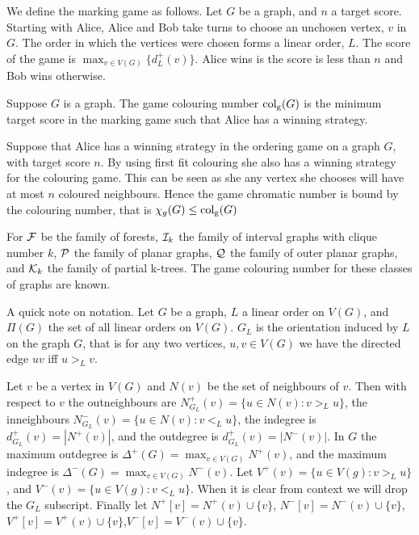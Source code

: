 We define the marking game as follows. Let $G$ be a graph, and $n$ a target score. Starting with Alice, Alice and Bob take turns to choose an unchosen vertex, $v$ in $G$. The order in which the vertices were chosen forms a linear order, $L$. The score of the game is $\max_{v\in V(G)}\{d^+_L(v)\}$. Alice wins is the score is less than $n$ and Bob wins otherwise.

\begin{definition}
    Suppose $G$ is a graph. The game colouring number $\operatorname{col_g}(G)$ is the minimum target score in the marking game such that Alice has a winning strategy. 
\end{definition}

Suppose that Alice has a winning strategy in the ordering game on a graph $G$, with target score $n$. By using first fit colouring she also has a winning strategy for the colouring game. This can be seen as she any vertex she chooses will have at most $n$ coloured neighbours. Hence the game chromatic number is bound by the colouring number, that is $\chi_g(G)\leq\operatorname{col_g}(G)$

For $\mathcal{F}$ be the family of forests, $\mathcal{I}_k$ the family of interval graphs with clique number $k$, $\mathcal{P}$ the family of planar graphs, $\mathcal{Q}$ the family of outer planar graphs, and $\mathcal{K}_k$ the family of partial k-trees. %
The game colouring number for these classes of graphs are known. %

A quick note on notation. Let $G$ be a graph, $L$ a linear order on $V(G)$, and $\Pi(G)$ the set of all linear orders on $V(G)$. $G_L$ is the orientation induced by $L$ on the graph $G$, that is for any two vertices, $u,v\in V(G)$ we have the directed edge $uv$ iff $u>_Lv$. 

Let $v$ be a vertex in $V(G)$ and $N(v)$ be the set of neighbours of $v$. Then with respect to $v$ the outneighbours are $N^+_{G_L}(v)=\{u\in N(v):v>_L u\}$, the inneighbours $N^-_{G_L}(v)=\{u\in N(v):v<_L u\}$, the indegree is $d^+_{G_L}(v)=|N^+(v)|$, and the outdegree is $d^+_{G_L}(v)=|N^-(v)|$. In $G$ the maximum outdegree is $\Delta^+(G)=\max_{v\in V(G)}N^+(v)$, and the maximum indegree is $\Delta^-(G)=\max_{v\in V(G)}N^-(v)$. Let $V^+(v)=\{u\in V(g):v>_L u\}$, and $V^-(v)=\{u\in V(g):v<_L u\}$.  When it is clear from context we will drop the $G_L$ subscript. Finally let $N^+[v]=N^+(v)\cup\{v\}$, $N^-[v]=N^-(v)\cup\{v\}$, $V^+[v]=V^+(v)\cup\{v\}$,$V^-[v]=V^-(v)\cup\{v\}$. %
 


